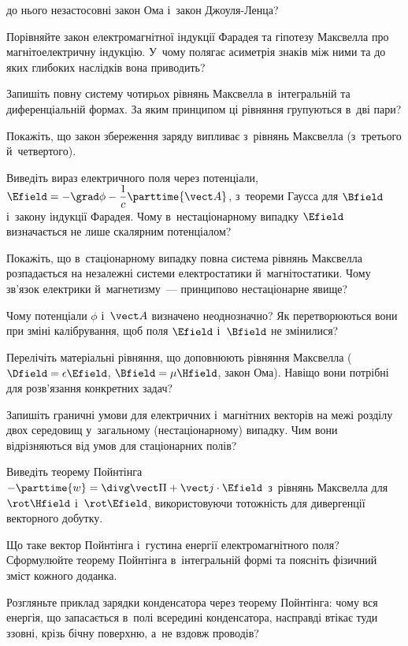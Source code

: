 \begin{Questions}
\begin{quizlist}
		  до нього незастосовні закон Ома і~закон Джоуля-Ленца?
		\item Порівняйте закон електромагнітної індукції Фарадея та гіпотезу Максвелла про
		  магнітоелектричну індукцію. У~чому полягає асиметрія знаків між ними та до яких
		  глибоких наслідків вона приводить?
		\item Запишіть повну систему чотирьох рівнянь Максвелла в~інтегральній та
		  диференціальній формах. За яким принципом ці рівняння групуються в~дві пари?
		\item Покажіть, що закон збереження заряду випливає з~рівнянь Максвелла
		  (з~третього й~четвертого).
		\item Виведіть вираз електричного поля через потенціали, $\Efield = -\grad\phi -
		  \dfrac1c\parttime{\vect A}$, з~теореми Гаусса для $\Bfield$ і~закону індукції
		  Фарадея. Чому в~нестаціонарному випадку $\Efield$ визначається не лише скалярним
		  потенціалом?
		\item Покажіть, що в~стаціонарному випадку повна система рівнянь Максвелла
		  розпадається на незалежні системи електростатики й~магнітостатики. Чому зв'язок
		  електрики й~магнетизму~--- принципово нестаціонарне явище?
		\item Чому потенціали $\phi$ і~$\vect A$ визначено неоднозначно? Як перетворюються
		  вони при зміні калібрування, щоб поля $\Efield$ і~$\Bfield$ не змінилися?
		\item Перелічіть матеріальні рівняння, що доповнюють рівняння Максвелла
		  ($\Dfield=\epsilon\Efield$, $\Bfield=\mu\Hfield$, закон Ома). Навіщо вони
		  потрібні для розв'язання конкретних задач?
		\item Запишіть граничні умови для електричних і~магнітних векторів на межі розділу
		  двох середовищ у~загальному (нестаціонарному) випадку. Чим вони відрізняються
		  від умов для стаціонарних полів?
		\item Виведіть теорему Пойнтінга $-\parttime{w} = \divg\vect\Pi + \vect
		  j\cdot\Efield$ з~рівнянь Максвелла для $\rot\Hfield$ і~$\rot\Efield$,
		  використовуючи тотожність для дивергенції векторного добутку.
		\item Що таке вектор Пойнтінга і~густина енергії електромагнітного поля?
		  Сформулюйте теорему Пойнтінга в~інтегральній формі та поясніть фізичний зміст
		  кожного доданка.
		\item Розгляньте приклад зарядки конденсатора через теорему Пойнтінга: чому вся
		  енергія, що запасається в~полі всередині конденсатора, насправді втікає туди
		  ззовні, крізь бічну поверхню, а~не вздовж проводів?

\end{quizlist}
\end{Questions}
